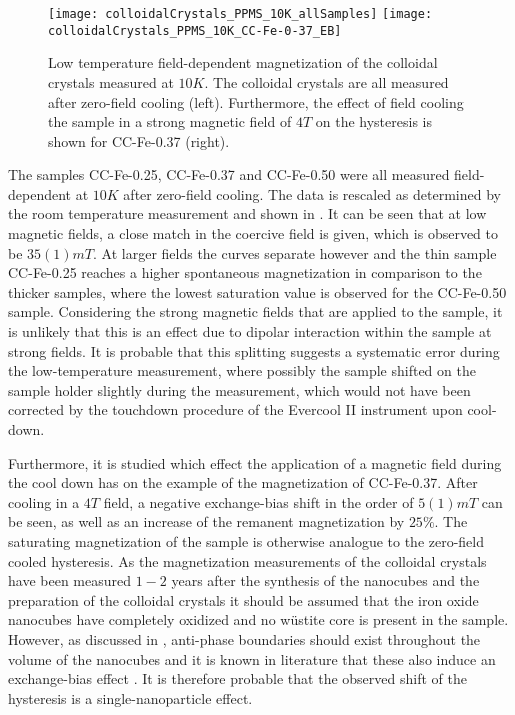 \documentclass[\main/dresen_thesis.tex]{subfiles}
\begin{document}

    \begin{figure}[tb]
      \centering
      \texttt{[image: colloidalCrystals\_PPMS\_10K\_allSamples]}
      \texttt{[image: colloidalCrystals\_PPMS\_10K\_CC-Fe-0-37\_EB]}
      \caption{\label{fig:colloidalCrystals:10KVSM}Low temperature field-dependent magnetization of the colloidal crystals measured at $10 \unit{K}$. The colloidal crystals are all measured after zero-field cooling (left). Furthermore, the effect of field cooling the sample in a strong magnetic field of $4 \unit{T}$ on the hysteresis is shown for CC-Fe-0.37 (right).}
    \end{figure}
    The samples CC-Fe-0.25, CC-Fe-0.37 and CC-Fe-0.50 were all measured field-dependent at $10 \unit{K}$ after zero-field cooling. The data is rescaled as determined by the room temperature measurement and shown in .
    It can be seen that at low magnetic fields, a close match in the coercive field is given, which is observed to be $35(1) \unit{mT}$.
    At larger fields the curves separate however and the thin sample CC-Fe-0.25 reaches a higher spontaneous magnetization in comparison to the thicker samples, where the lowest saturation value is observed for the CC-Fe-0.50 sample.
    Considering the strong magnetic fields that are applied to the sample, it is unlikely that this is an effect due to dipolar interaction within the sample at strong fields.
    It is probable that this splitting suggests a systematic error during the low-temperature measurement, where possibly the sample shifted on the sample holder slightly during the measurement, which would not have been corrected by the touchdown procedure of the Evercool II instrument upon cool-down.

    Furthermore, it is studied which effect the application of a magnetic field during the cool down has on the example of the magnetization of CC-Fe-0.37.
    After cooling in a $4 \unit{T}$ field, a negative exchange-bias shift in the order of $5(1) \unit{mT}$ can be seen, as well as an increase of the remanent magnetization by $25 \%$.
    The saturating magnetization of the sample is otherwise analogue to the zero-field cooled hysteresis.
    As the magnetization measurements of the colloidal crystals have been measured $1 - 2$ years after the synthesis of the nanocubes and the preparation of the colloidal crystals it should be assumed that the iron oxide nanocubes have completely oxidized and no w\"ustite core is present in the sample.
    However, as discussed in , anti-phase boundaries should exist throughout the volume of the nanocubes and it is known in literature that these also induce an exchange-bias effect \cite{Wetterskog_2013_Anoma}.
    It is therefore probable that the observed shift of the hysteresis is a single-nanoparticle effect.
\end{document}
